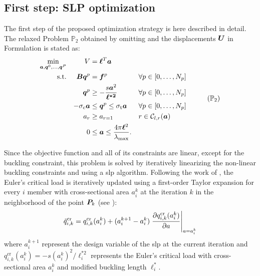 \subsection{First step: SLP optimization}
The first step of the proposed optimization strategy is here described in detail. The relaxed Problem $\mathbb{P}_2$ obtained by omitting  and the displacements $\bm{U}$ in Formulation  is stated as:
\begin{equation}
    \begin{aligned}
    \min_{\vect{a}, \vect{q}^0, \dots, \vect{q}^P}  && V &= \vect{\ell}^{T}\vect{a}\\
    \textrm{s.t.}   && \matr{B}\vect{q}^p &= \vect{f}^p && \forall p \in [0,\dots,N_p]\\
    && \vect{q}^p &\geq -\frac{s\vect{a}^2}{\vect{\ell^{*2}}} && \forall p \in [0,\dots,N_p] \\
    && -\sigma_\text{c}\vect{a} &\leq \vect{q}^p \leq \sigma_\text{t}\vect{a} && \forall p \in [0,\dots,N_p] \\
    && a_{r}&\geq a_{r=1} && r \in \mathcal{C}_{l,r}(\vect{a}) \\
    && 0 &\leq \vect{a} \leq \frac{4 \pi \vect{\ell}^2}{\lambda_{\text{max}}}. \\
    \end{aligned}
    \tag{$\mathbb{P}_2$}
    \label{eq:04_optim_no_constr}
\end{equation}

Since the objective function and all of its constraints are linear, except for the buckling constraint, this problem is solved by iteratively linearizing the non-linear buckling constraints and using a \gls{slp} algorithm. Following the work of , the Euler's critical load is iteratively updated using a first-order Taylor expansion for every $i$ member with cross-sectional area $a_{i}^k$ at the iteration $k$ in the neighborhood of the point $\bm{P}_{k}$ (see ):
\begin{equation}
    \tilde{q}_{i,k}^{\text{cr}} = q_{i,k}^{\text{cr}}(a_{i}^k) + (a_{i}^{k+1} - a_{i}^k)\left.\frac{\partial q_{i,k}^{\text{cr}}(a_{i}^k)}{\partial a}\right\rvert_{a=a_{i}^k}
\end{equation}
where $a_{i}^{k+1}$ represent the design variable of the \gls{slp} at the current iteration and $q^{\text{cr}}_{i,k}(a_{i}^k) = -s ({a_{i}^k})^2/\ell^{*2}_i$ represents the Euler's critical load with cross-sectional area $a_{i}^k$ and modified buckling length $\ell^{*}_i$. 

